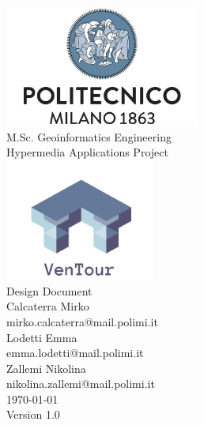 \documentclass[12pt]{report}
\begin{document}
	\begin{titlepage}
		\centering
		\vfill
		{
			\includegraphics[width =\linewidth, height = 4cm, keepaspectratio]{PolitecnicoLogo.png}
			\label{fig:PolitecnicoLogo}
			\large \\[2ex]M.Sc. Geoinformatics Engineering\\
			\large Hypermedia Applications Project\\[9ex]
			\includegraphics[width =\linewidth, height = 4cm, keepaspectratio]{Images/VentourLogo.png}\\[9ex]

			\huge Design Document\\[3ex]

			\normalsize Calcaterra Mirko\\[0.5ex]
			\normalsize mirko.calcaterra@mail.polimi.it\\[1.5ex]
			\normalsize Lodetti Emma\\[0.5ex]
			\normalsize emma.lodetti@mail.polimi.it\\[1.5ex]
            \normalsize Zallemi Nikolina\\[0.5ex]
			\normalsize nikolina.zallemi@mail.polimi.it\\[1.5ex]
			\normalsize \today\\[1.5ex]
			\normalsize Version 1.0
		}

	\end{titlepage}

	\newpage

	
	\addtocounter{page}{1}

	\clearpage
	\tableofcontents
	\thispagestyle{fancy}
	
	\newpage
	
	
	
	
	
\begin{appendices}
    
\end{appendices}
	\thispagestyle{fancy}
 
\end{document}

